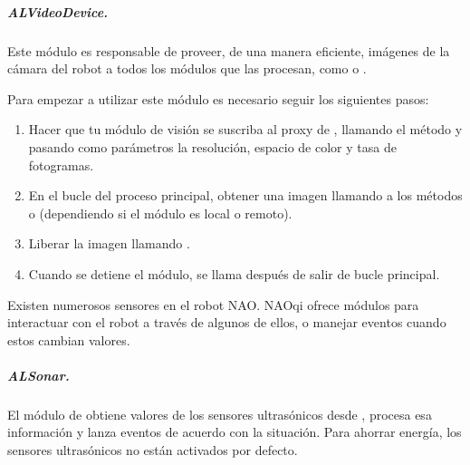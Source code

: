 \subparagraph{ALVideoDevice.}
\label{\detokenize{chapter_one/naoqi:alvideodevice}}
Este módulo es responsable de proveer, de una manera eficiente, imágenes de la
cámara del robot a todos los módulos que las procesan, como 
o .


Para empezar a utilizar este módulo es necesario seguir los siguientes pasos:
\begin{enumerate}
\item {} 
Hacer que tu módulo de visión se suscriba al proxy de , llamando el método  y pasando como parámetros la resolución, espacio de color y tasa de fotogramas.

\item {} 
En el bucle del proceso principal, obtener una imagen llamando a los métodos  o  (dependiendo si el módulo es local o remoto).

\item {} 
Liberar la imagen llamando .

\item {} 
Cuando se detiene el módulo, se llama  después de salir de bucle principal.

\end{enumerate}

Existen numerosos sensores en el robot NAO. NAOqi ofrece módulos para interactuar
con el robot a través de algunos de ellos, o manejar eventos cuando estos
cambian valores.


\subparagraph{ALSonar.}
\label{\detokenize{chapter_one/naoqi:alsonar}}
El módulo de  obtiene valores de los sensores ultrasónicos desde
, procesa esa información y lanza eventos de acuerdo con la situación.
Para ahorrar energía, los sensores ultrasónicos no están activados por defecto.

